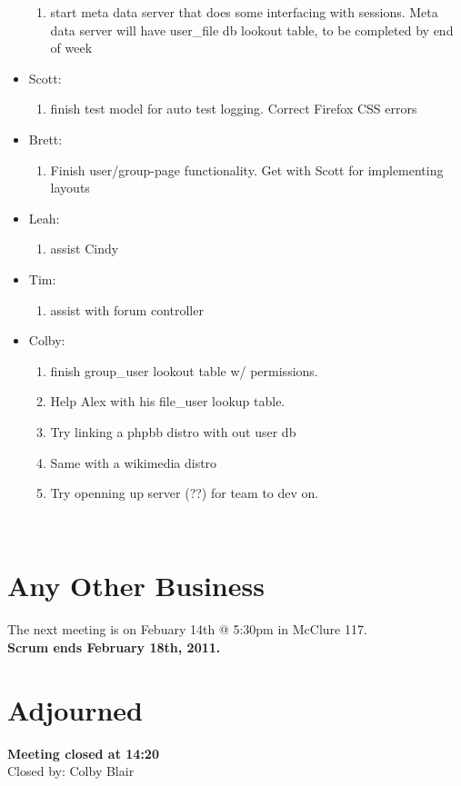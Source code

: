 \documentclass[12pt]{article}
\begin{document}
\begin{itemize}
\begin{enumerate}
 \item start meta data server that does some interfacing with sessions. Meta data server will have user_file db lookout table, to be completed by end of week
\end{enumerate}
\item Scott:
\begin{enumerate}
 \item finish test model for auto test logging. Correct Firefox CSS errors
\end{enumerate}
\item Brett:
\begin{enumerate}
 \item Finish user/group-page functionality. Get with Scott for implementing layouts
\end{enumerate}
\item Leah:
\begin{enumerate}
 \item assist Cindy
\end{enumerate}
\item Tim:
\begin{enumerate}
 \item assist with forum controller
\end{enumerate}
\item Colby:
\begin{enumerate}
 \item finish group_user lookout table w/ permissions. 
 \item Help Alex with his file_user lookup table. 
 \item Try linking a phpbb distro with out user db
 \item Same with a wikimedia distro
 \item Try openning up server (??) for team to dev on.
\end{enumerate}
\end{itemize}
\\  
\section{Any Other Business}
The next meeting is on Febuary 14th @ 5:30pm in McClure 117. \\
\textbf{Scrum ends February 18th, 2011.}
\\
\section{Adjourned}
\textbf{Meeting closed at 14:20} \\
Closed by: Colby Blair \\
\end{document}
